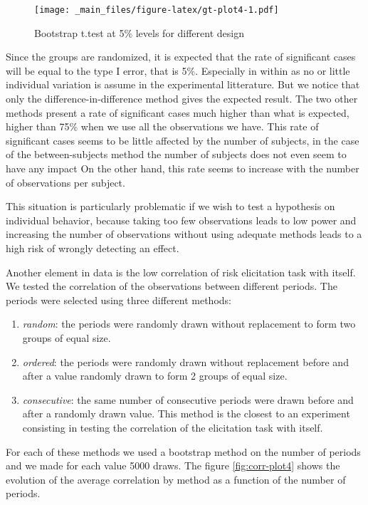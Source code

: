 \documentclass[
]{book}
\providecommand{\tightlist}{%
  \setlength{\itemsep}{0pt}\setlength{\parskip}{0pt}}
\begin{document}
\begin{figure}
\centering
\texttt{[image: \_main\_files/figure-latex/gt-plot4-1.pdf]}
\caption{\label{fig:gt-plot4}Bootstrap t.test at 5\% levels for different design}
\end{figure}

Since the groups are randomized, it is expected that the rate of
significant cases will be equal to the type I error, that is 5\%.
Especially in within as no or little individual variation is assume in the
experimental litterature.
But we notice that only the difference-in-difference method gives the expected
result.
The two other methods present a rate of significant cases much
higher than what is expected, higher than 75\% when we use all the
observations we have.
This rate of significant cases seems to be little
affected by the number of subjects, in the case of the between-subjects method
the number of subjects does not even seem to have any impact On the
other hand, this rate seems to increase with the number of observations
per subject.

This situation is particularly problematic if we wish to
test a hypothesis on individual behavior, because taking too few
observations leads to low power and increasing the number of
observations without using adequate methods leads to a high risk of
wrongly detecting an effect.

Another element in data is the low correlation of risk elicitation task with
itself.
We tested the correlation of the observations between different periods.
The periods were selected using three different methods:

\begin{enumerate}
\def\labelenumi{\arabic{enumi}.}
\tightlist
\item
  \emph{random}: the periods were randomly drawn without replacement to form
  two groups of equal size.
\item
  \emph{ordered}: the periods were randomly drawn without replacement
  before and after a value randomly drawn to form 2 groups of equal
  size.
\item
  \emph{consecutive}: the same number of consecutive periods were drawn before and
  after a randomly drawn value. This method is the closest to an
  experiment consisting in testing the correlation of the elicitation
  task with itself.
\end{enumerate}

For each of these methods we used a bootstrap method on the number of
periods and we made for each value 5000 draws. The figure \ref{fig:corr-plot4}
shows the evolution of the average correlation by method as a function of the
number of periods.
\end{document}

